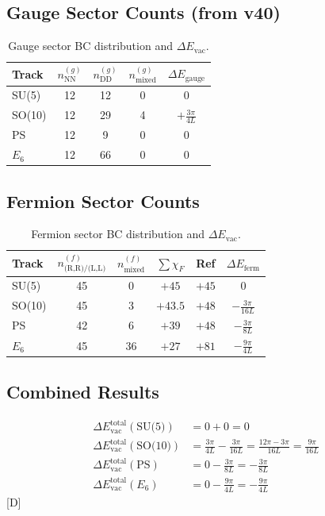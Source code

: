 \documentclass[11pt,a4paper]{article}
\newcommand{\tagD}{\textcolor{blue!70!black}{[D]}}
\begin{document}
\subsection{Gauge Sector Counts (from v40)}

\begin{table}[h]
\centering
\begin{tabular}{lcccc}
\toprule
Track & $n_{\text{NN}}^{(g)}$ & $n_{\text{DD}}^{(g)}$ & $n_{\text{mixed}}^{(g)}$ & $\Delta E_{\text{gauge}}$ \\
\midrule
SU(5) & 12 & 12 & 0 & 0 \\
SO(10) & 12 & 29 & 4 & $+\frac{3\pi}{4L}$ \\
PS & 12 & 9 & 0 & 0 \\
$E_6$ & 12 & 66 & 0 & 0 \\
\bottomrule
\end{tabular}
\caption{Gauge sector BC distribution and $\Delta E_{\text{vac}}$.}
\label{tab:gauge-counts}
\end{table}

\subsection{Fermion Sector Counts}

\begin{table}[h]
\centering
\begin{tabular}{lccccc}
\toprule
Track & $n_{\text{(R,R)/(L,L)}}^{(f)}$ & $n_{\text{mixed}}^{(f)}$ & $\sum \chi_F$ & Ref & $\Delta E_{\text{ferm}}$ \\
\midrule
SU(5) & 45 & 0 & $+45$ & $+45$ & $0$ \\
SO(10) & 45 & 3 & $+43.5$ & $+48$ & $-\frac{3\pi}{16L}$ \\
PS & 42 & 6 & $+39$ & $+48$ & $-\frac{3\pi}{8L}$ \\
$E_6$ & 45 & 36 & $+27$ & $+81$ & $-\frac{9\pi}{4L}$ \\
\bottomrule
\end{tabular}
\caption{Fermion sector BC distribution and $\Delta E_{\text{vac}}$.}
\label{tab:ferm-counts}
\end{table}

\subsection{Combined Results}

\begin{resultbox}
\begin{align}
\label{eq:total-su5}
\Delta E_{\text{vac}}^{\text{total}}(\text{SU(5)}) &= 0 + 0 = 0 \\
\label{eq:total-so10}
\Delta E_{\text{vac}}^{\text{total}}(\text{SO(10)}) &= \frac{3\pi}{4L} - \frac{3\pi}{16L}
= \frac{12\pi - 3\pi}{16L} = \frac{9\pi}{16L} \\
\label{eq:total-ps}
\Delta E_{\text{vac}}^{\text{total}}(\text{PS}) &= 0 - \frac{3\pi}{8L} = -\frac{3\pi}{8L} \\
\label{eq:total-e6}
\Delta E_{\text{vac}}^{\text{total}}(E_6) &= 0 - \frac{9\pi}{4L} = -\frac{9\pi}{4L}
\end{align}
\tagD
\end{resultbox}
\end{document}
